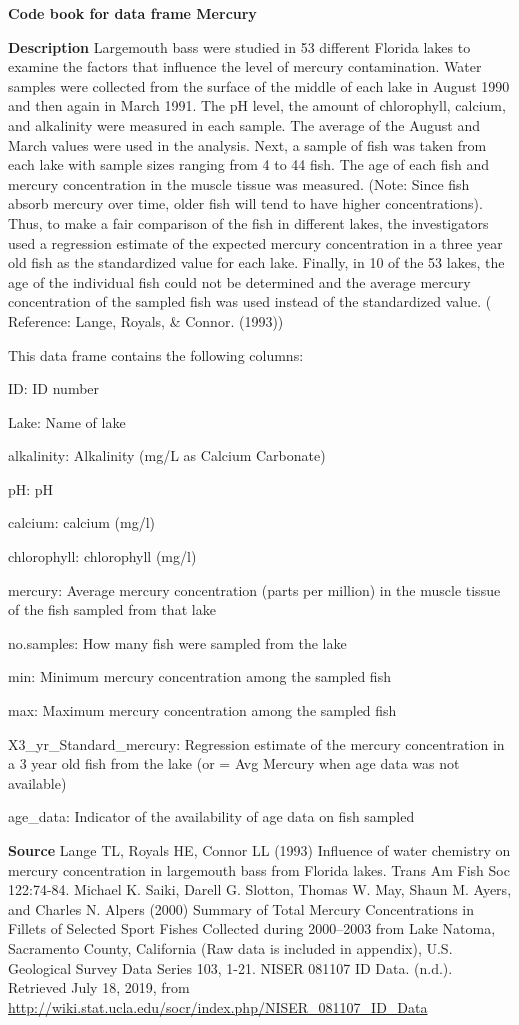\documentclass[]{book}
\begin{document}
\textbf{Code book for data frame Mercury}

\textbf{Description}
Largemouth bass were studied in 53 different Florida lakes to examine the factors that influence the level of mercury contamination. Water samples were collected from the surface of the middle of each lake in August 1990 and then again in March 1991. The pH level, the amount of chlorophyll, calcium, and alkalinity were measured in each sample. The average of the August and March values were used in the analysis. Next, a sample of fish was taken from each lake with sample sizes ranging from 4 to 44 fish. The age of each fish and mercury concentration in the muscle tissue was measured. (Note: Since fish absorb mercury over time, older fish will tend to have higher concentrations). Thus, to make a fair comparison of the fish in different lakes, the investigators used a regression estimate of the expected mercury concentration in a three year old fish as the standardized value for each lake. Finally, in 10 of the 53 lakes, the age of the individual fish could not be determined and the average mercury concentration of the sampled fish was used instead of the standardized value. ( Reference: Lange, Royals, \& Connor. (1993))

This data frame contains the following columns:

ID: ID number

Lake: Name of lake

alkalinity: Alkalinity (mg/L as Calcium Carbonate)

pH: pH

calcium: calcium (mg/l)

chlorophyll: chlorophyll (mg/l)

mercury: Average mercury concentration (parts per million) in the muscle tissue of the fish sampled from that lake

no.samples: How many fish were sampled from the lake

min: Minimum mercury concentration among the sampled fish

max: Maximum mercury concentration among the sampled fish

X3\_yr\_Standard\_mercury: Regression estimate of the mercury concentration in a 3 year old fish from the lake (or = Avg Mercury when age data was not available)

age\_data: Indicator of the availability of age data on fish sampled

\textbf{Source}
Lange TL, Royals HE, Connor LL (1993) Influence of water chemistry on mercury concentration in largemouth bass from Florida lakes. Trans Am Fish Soc 122:74-84.
Michael K. Saiki, Darell G. Slotton, Thomas W. May, Shaun M. Ayers, and Charles N. Alpers (2000) Summary of Total Mercury Concentrations in Fillets of Selected Sport Fishes Collected during 2000--2003 from Lake Natoma, Sacramento County, California (Raw data is included in appendix), U.S. Geological Survey Data Series 103, 1-21.
NISER 081107 ID Data. (n.d.). Retrieved July 18, 2019, from \url{http://wiki.stat.ucla.edu/socr/index.php/NISER_081107_ID_Data}
\end{document}
